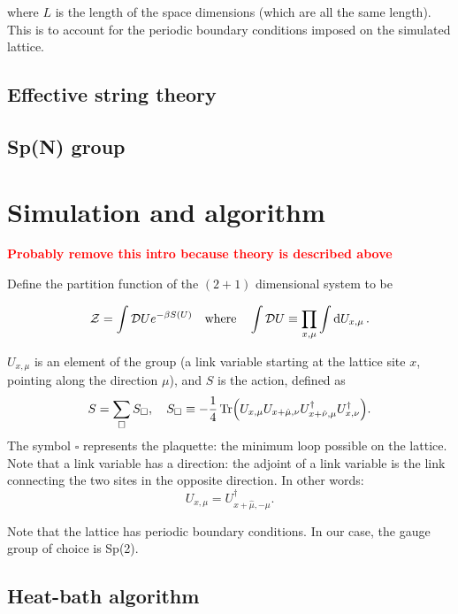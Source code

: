 \documentclass[reqno,12pt]{article}
\numberwithin{equation}{section}
\newcommand{\red}[1]{\textbf{\textcolor{red}{#1}}}
\begin{document}
where $L$ is the length of the space dimensions (which are all the same length). This is to account for the periodic boundary conditions
imposed on the simulated lattice.

\subsection{Effective string theory}

\subsection{Sp(N) group}

\section{Simulation and algorithm}
\red{Probably remove this intro because theory is described above}

Define the partition function of the $(2+1)$ dimensional system to be

\begin{equation}
	\mathcal{Z} = \int \mathcal{D}U e^{-\beta S(U)} \qq{where} \int \mathcal{D} U \equiv \prod_{x,\mu} \int \dd{U_{x,\mu}}.
\end{equation}

$U_{x,\mu}$ is an element of the group (a link variable starting at the lattice site $x$, pointing
along the direction $\mu$), 
and $S$ is the action, defined as
\begin{equation}
	S = \sum_\square S_\square \qc 
	S_\square \equiv - \frac{1}{4} \Tr(U_{x,\mu}U_{x+\hat{\mu}, \nu}U^\dagger_{x+\hat{\nu}, \mu}U^\dagger_{x,\nu}).
\end{equation}
The symbol $\square$ represents the plaquette: the minimum loop possible on the lattice. Note that a link 
variable has a direction: the adjoint of a link variable is the link connecting the two sites in the opposite
direction. In other words:
\begin{equation}
	U_{x,\mu} = U_{x+\hat{\mu}, -\mu}^\dagger.
\end{equation}

Note that the lattice has periodic boundary conditions. In our case, the gauge group of choice is Sp(2).

\subsection{Heat-bath algorithm}
\end{document}
